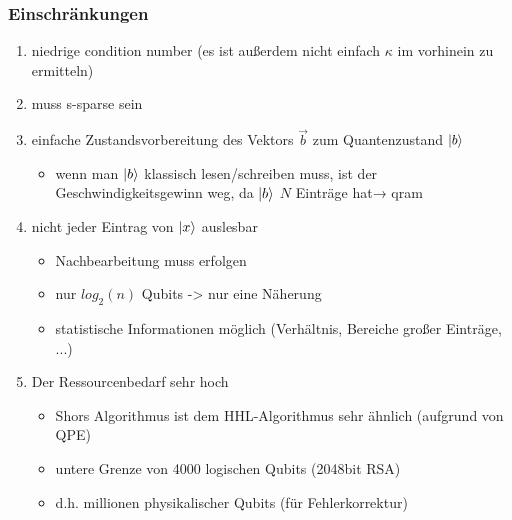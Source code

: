 \begin{frame}
    \frametitle{Einschränkungen}
    \begin{enumerate}
        \item niedrige condition number (es ist außerdem nicht einfach $\kappa$ im vorhinein zu ermitteln)

        \item muss s-sparse sein

        \item einfache Zustandsvorbereitung des Vektors $\vec b$ zum Quantenzustand $\ket{b}$
            \begin{itemize}
                \item wenn man $\ket{b}$ klassisch lesen/schreiben muss, ist der Geschwindigkeitsgewinn weg, da $\ket{b}$ $N$ Einträge hat→ qram
            \end{itemize}
        \item nicht jeder Eintrag von $\ket{x}$ auslesbar
            \begin{itemize}
                \item Nachbearbeitung muss erfolgen
                \item nur $log_2(n)$ Qubits -> nur eine Näherung
                \item statistische Informationen möglich (Verhältnis, Bereiche großer Einträge, ...)
            \end{itemize}
 
        \item Der Ressourcenbedarf sehr hoch
            \begin{itemize}
                \item Shors Algorithmus ist dem HHL-Algorithmus sehr ähnlich (aufgrund von QPE)
                \item untere Grenze von 4000 logischen Qubits (2048bit RSA)
                \item d.h. millionen physikalischer Qubits (für Fehlerkorrektur)
            \end{itemize}
    \end{enumerate}

\end{frame}

